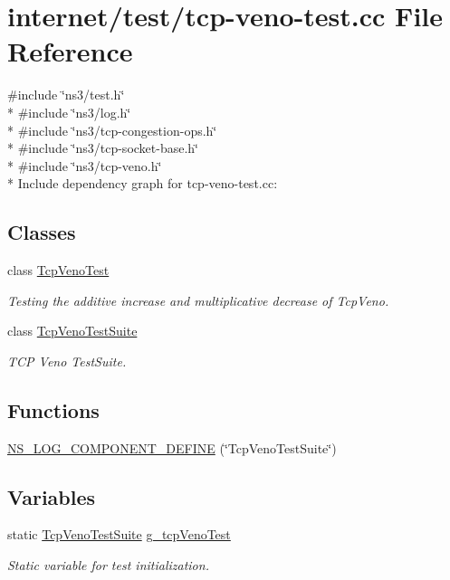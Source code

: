 \hypertarget{tcp-veno-test_8cc}{}\section{internet/test/tcp-\/veno-\/test.cc File Reference}
\label{tcp-veno-test_8cc}
{\ttfamily \#include \char`\"{}ns3/test.\+h\char`\"{}}\\*
{\ttfamily \#include \char`\"{}ns3/log.\+h\char`\"{}}\\*
{\ttfamily \#include \char`\"{}ns3/tcp-\/congestion-\/ops.\+h\char`\"{}}\\*
{\ttfamily \#include \char`\"{}ns3/tcp-\/socket-\/base.\+h\char`\"{}}\\*
{\ttfamily \#include \char`\"{}ns3/tcp-\/veno.\+h\char`\"{}}\\*
Include dependency graph for tcp-\/veno-\/test.cc\+:
\subsection*{Classes}
\begin{DoxyCompactItemize}
\item 
class \hyperlink{classTcpVenoTest}{Tcp\+Veno\+Test}
\begin{DoxyCompactList}\small\item\em Testing the additive increase and multiplicative decrease of Tcp\+Veno. \end{DoxyCompactList}\item 
class \hyperlink{classTcpVenoTestSuite}{Tcp\+Veno\+Test\+Suite}
\begin{DoxyCompactList}\small\item\em T\+CP Veno Test\+Suite. \end{DoxyCompactList}\end{DoxyCompactItemize}
\subsection*{Functions}
\begin{DoxyCompactItemize}
\item 
\hyperlink{tcp-veno-test_8cc_ac02cbd6b83a8114d4ac8b82e1cbc5a95}{N\+S\+\_\+\+L\+O\+G\+\_\+\+C\+O\+M\+P\+O\+N\+E\+N\+T\+\_\+\+D\+E\+F\+I\+NE} (\char`\"{}Tcp\+Veno\+Test\+Suite\char`\"{})
\end{DoxyCompactItemize}
\subsection*{Variables}
\begin{DoxyCompactItemize}
\item 
static \hyperlink{classTcpVenoTestSuite}{Tcp\+Veno\+Test\+Suite} \hyperlink{tcp-veno-test_8cc_a88fbef1d2a26dcd8e595f1358dd974bf}{g\+\_\+tcp\+Veno\+Test}
\begin{DoxyCompactList}\small\item\em Static variable for test initialization. \end{DoxyCompactList}\end{DoxyCompactItemize}


